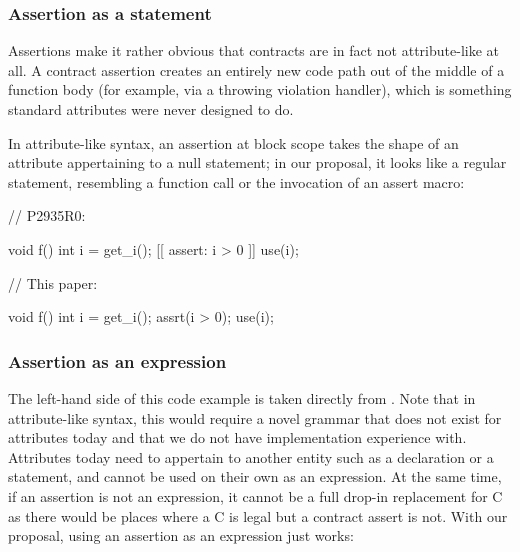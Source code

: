 \subsubsection{Assertion as a statement}

Assertions make it rather obvious that contracts are in fact not attribute-like at all. A contract assertion creates an entirely new code path out of the middle of a function body (for example, via a throwing violation handler), which is something standard attributes were never designed to do. 

In attribute-like syntax, an assertion at block scope takes the shape of an attribute appertaining to a null statement; in our proposal, it looks like a regular statement, resembling a function call or the invocation of an assert macro:
\vspace{5mm}

\begin{minipage}{8cm}
\begin{codeblock}
// P2935R0:

void f() {
  int i = get_i();
  [[ assert: i > 0 ]]
  use(i);
}
\end{codeblock}
\end{minipage}
\begin{minipage}{8cm}
\begin{codeblock}
// This paper:

void f() {
  int i = get_i();
  assrt(i > 0);
  use(i);
}
\end{codeblock}
\end{minipage}

\subsubsection{Assertion as an expression}

The left-hand side of this code example is taken directly from \cite{P2935R0}. Note that in attribute-like syntax, this would require a novel grammar that does not exist for attributes today and that we do not have implementation experience with. Attributes today need to appertain to another entity such as a declaration or a statement, and cannot be used on their own as an expression. At the same time, if an assertion is not an expression, it cannot be a full drop-in replacement for C  as there would be places where a C  is legal but a contract assert is not. With our proposal, using an assertion as an expression just works:
\vspace{5mm}

